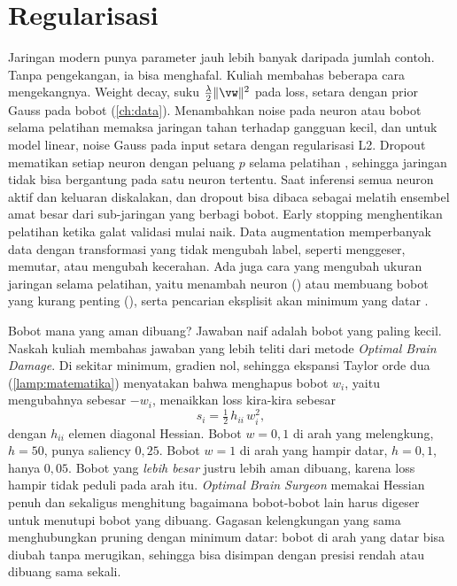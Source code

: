 \section{Regularisasi}

Jaringan modern punya parameter jauh lebih banyak daripada jumlah contoh. Tanpa pengekangan, ia
bisa menghafal. Kuliah membahas beberapa cara mengekangnya. Weight decay, suku
$\tfrac\lambda2\|\vw\|^2$ pada loss, setara dengan prior Gauss pada bobot (\cref{ch:data}).
Menambahkan noise pada neuron atau bobot selama pelatihan memaksa jaringan tahan terhadap
gangguan kecil, dan untuk model linear, noise Gauss pada input setara dengan regularisasi L2.
Dropout mematikan setiap neuron dengan peluang $p$ selama pelatihan \citep{hinton2012}, sehingga
jaringan tidak bisa bergantung pada satu neuron tertentu. Saat inferensi semua neuron aktif dan
keluaran diskalakan, dan dropout bisa dibaca sebagai melatih ensembel amat besar dari
sub-jaringan yang berbagi bobot. Early stopping menghentikan pelatihan ketika galat validasi
mulai naik. Data augmentation memperbanyak data dengan transformasi yang tidak mengubah label,
seperti menggeser, memutar, atau mengubah kecerahan. Ada juga cara yang mengubah ukuran jaringan
selama pelatihan, yaitu menambah neuron () atau membuang bobot yang kurang penting
(), serta pencarian eksplisit akan minimum yang datar \citep{hochreiter1997flat}.

Bobot mana yang aman dibuang? Jawaban naif adalah bobot yang paling kecil. Naskah kuliah membahas jawaban yang lebih teliti dari
metode \emph{Optimal Brain Damage}. Di sekitar minimum, gradien nol, sehingga ekspansi Taylor orde dua (\cref{lamp:matematika})
menyatakan bahwa menghapus bobot $w_i$, yaitu mengubahnya sebesar $-w_i$, menaikkan loss kira-kira sebesar
\begin{equation}
s_i=\tfrac12\,h_{ii}\,w_i^2,
\end{equation}
dengan $h_{ii}$ elemen diagonal Hessian. Bobot $w=0{,}1$ di arah yang melengkung, $h=50$, punya saliency $0{,}25$. Bobot $w=1$ di
arah yang hampir datar, $h=0{,}1$, hanya $0{,}05$. Bobot yang \emph{lebih besar} justru lebih aman dibuang, karena loss hampir tidak peduli
pada arah itu. \emph{Optimal Brain Surgeon} memakai Hessian penuh dan sekaligus menghitung bagaimana bobot-bobot lain harus digeser
untuk menutupi bobot yang dibuang. Gagasan kelengkungan yang sama menghubungkan pruning dengan minimum datar: bobot di arah yang datar
bisa diubah tanpa merugikan, sehingga bisa disimpan dengan presisi rendah atau dibuang sama sekali.

